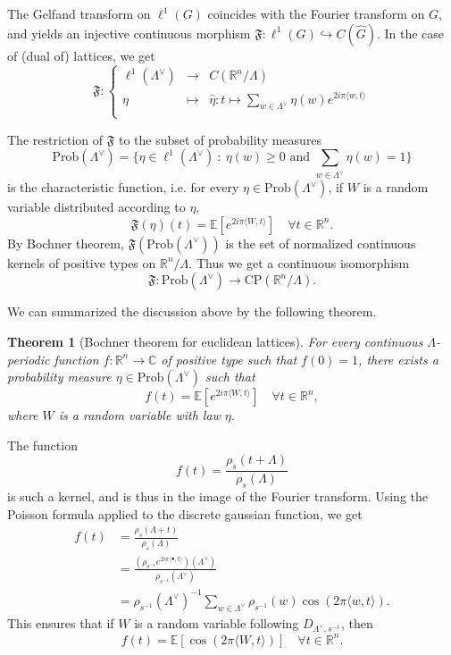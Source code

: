 \documentclass{article}
\newtheorem{theorem}{Theorem}
\begin{document}
The Gelfand transform on $\ell^1(G)$ coincides with the Fourier transform on $G$, and yields an injective continuous morphism $\mathfrak F : \ell^1(G)\hookrightarrow C(\hat G)$. In the case of (dual of) lattices, we get
\[\mathfrak F : \left\{ \begin{array}{rcl}
\ell^1(\Lambda^\vee) & \rightarrow &  C(\mathbb R^n / \Lambda) \\
\eta & \mapsto & \hat \eta : t \mapsto \sum_{w\in \Lambda^\vee} \eta(w) e^{2i\pi \langle w , t\rangle} \\ 
\end{array}\right.\]

The restriction of $\mathfrak F$ to the subset of probability measures
\[\text{Prob}(\Lambda^\vee) =\{\eta\in\ell^1(\Lambda^\vee) \ :\ \eta(w)\geq 0 \text{ and } \sum_{w\in \Lambda^\vee} \eta(w) = 1\}  \]
is the characteristic function, i.e. for every $\eta\in\text{Prob} (\Lambda^\vee)$, if $W$ is a random variable distributed according to $\eta$, 
\[\mathfrak F(\eta)(t) = \mathbb E[e^{2i\pi \langle W , t\rangle } ]\quad\forall t\in \mathbb R^n.\] 
By Bochner theorem, $\mathfrak F(\text{Prob} (\Lambda^\vee))$ is the set of normalized continuous kernels of positive types on $\mathbb R^n / \Lambda$. Thus we get a continuous isomorphism 
\[\mathfrak F : \text{Prob}(\Lambda^\vee ) \rightarrow \text{CP}(\mathbb R^n / \Lambda).\]

We can summarized the discussion above by the following theorem.

\begin{theorem}[Bochner theorem for euclidean lattices]\label{BochnerLattices}
For every continuous $\Lambda$-periodic function $f : \mathbb R^n \rightarrow \mathbb C$ of positive type such that $f(0) = 1$, there exists a probability measure $\eta\in \text{Prob} (\Lambda^\vee)$ such that 
\[f(t) =\mathbb E[e^{2i\pi \langle W , t\rangle } ]\quad\forall t\in \mathbb R^n ,\]
where $W$ is a random variable with law $\eta$.
\end{theorem}

The function 
\[f(t) = \frac{\rho_s(t+\Lambda)}{\rho_s(\Lambda)}\]
is such a kernel, and is thus in the image of the Fourier transform. Using the Poisson formula applied to the discrete gaussian function, we get 
\[\begin{split} 
f(t) & = \frac{ \rho_s (\Lambda + t)}{\rho_s (\Lambda )} \\ 
	& = \frac{ ( \rho_{s^{-1}} e^{2i\pi \langle \bullet , t\rangle }) (\Lambda^\vee) }{ \rho_{s^{-1}}(\Lambda^\vee)} \\
	& = \rho_{s^{-1}}(\Lambda^\vee)^{-1}\sum_{w\in \Lambda^\vee} \rho_{s^{-1}}(w) \cos (2\pi \langle w,t\rangle ) .
\end{split}\]
This ensures that if $W$ is a random variable following $D_{\Lambda^\vee, s^{-1}}$, then 
\[f(t) = \mathbb E[\cos (2\pi \langle W , t \rangle ) ] \quad \forall t\in \mathbb R^n.\] 
\end{document}
